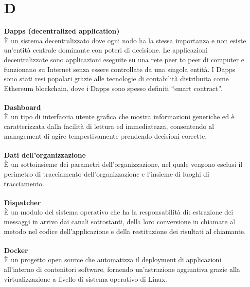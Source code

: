 \section{D}
\textbf{Dapps (decentralized application)}\\
È un sistema decentralizzato dove ogni nodo ha la stessa importanza e non esiste un'entità centrale dominante con poteri di decisione. Le applicazioni decentralizzate sono applicazioni eseguite su una rete peer to peer di computer e funzionano su Internet senza essere controllate da una singola entità. I Dapps sono stati resi popolari grazie alle tecnologie di contabilità distribuita come Ethereum blockchain, dove i Dapps sono spesso definiti “smart contract”. \\ \\
\textbf{Dashboard}\\
È un tipo di interfaccia utente grafica che mostra informazioni generiche ed è caratterizzata dalla facilità di lettura ed immediatezza, consentendo al management di agire tempestivamente prendendo decisioni corrette. \\ \\
\textbf{Dati dell'organizzazione}\\
È un sottoinsieme dei parametri dell'organizzazione, nel quale vengono esclusi il perimetro di tracciamento dell'organizzazione e l'insieme di luoghi di tracciamento. \\ \\
\textbf{Dispatcher}\\
È un modulo del sistema operativo che ha la responsabilità di: estrazione dei messaggi in arrivo dai canali sottostanti, della loro conversione in chiamate al metodo nel codice dell'applicazione e della restituzione dei risultati al chiamante. \\ \\
\textbf{Docker}\\
È un progetto open source che automatizza il deployment di applicazioni all'interno di contenitori software, fornendo un'astrazione aggiuntiva grazie alla virtualizzazione a livello di sistema operativo di Linux. \\ \\
\clearpage